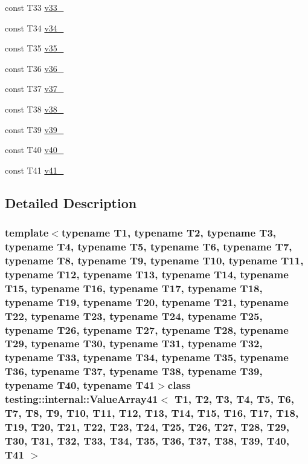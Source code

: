 \begin{DoxyCompactItemize}
\item 
const \-T33 \hyperlink{classtesting_1_1internal_1_1ValueArray41_a7a6cefe370b709c3a7b35b6d5ca8c778}{v33\-\_\-}
\item 
const \-T34 \hyperlink{classtesting_1_1internal_1_1ValueArray41_ab379e4d515d66bc57e05267515fab1d9}{v34\-\_\-}
\item 
const \-T35 \hyperlink{classtesting_1_1internal_1_1ValueArray41_a0a36112ac9b7a13572874977627ed192}{v35\-\_\-}
\item 
const \-T36 \hyperlink{classtesting_1_1internal_1_1ValueArray41_a531a52e3e8de6e982edd23c2547e4c49}{v36\-\_\-}
\item 
const \-T37 \hyperlink{classtesting_1_1internal_1_1ValueArray41_a2c4a91368c3edf933948acb4996a833d}{v37\-\_\-}
\item 
const \-T38 \hyperlink{classtesting_1_1internal_1_1ValueArray41_a364bf323d933a4adac3a9b46952ae1d3}{v38\-\_\-}
\item 
const \-T39 \hyperlink{classtesting_1_1internal_1_1ValueArray41_a0bd84ae118aa56fd251e494d1abc19fb}{v39\-\_\-}
\item 
const \-T40 \hyperlink{classtesting_1_1internal_1_1ValueArray41_ac99de9e6d59182db6141430e54f51e9c}{v40\-\_\-}
\item 
const \-T41 \hyperlink{classtesting_1_1internal_1_1ValueArray41_ad6f7550d60e8d13ade4c5033d07312e9}{v41\-\_\-}
\end{DoxyCompactItemize}


\subsection{\-Detailed \-Description}
\subsubsection*{template$<$typename T1, typename T2, typename T3, typename T4, typename T5, typename T6, typename T7, typename T8, typename T9, typename T10, typename T11, typename T12, typename T13, typename T14, typename T15, typename T16, typename T17, typename T18, typename T19, typename T20, typename T21, typename T22, typename T23, typename T24, typename T25, typename T26, typename T27, typename T28, typename T29, typename T30, typename T31, typename T32, typename T33, typename T34, typename T35, typename T36, typename T37, typename T38, typename T39, typename T40, typename T41$>$class testing\-::internal\-::\-Value\-Array41$<$ T1, T2, T3, T4, T5, T6, T7, T8, T9, T10, T11, T12, T13, T14, T15, T16, T17, T18, T19, T20, T21, T22, T23, T24, T25, T26, T27, T28, T29, T30, T31, T32, T33, T34, T35, T36, T37, T38, T39, T40, T41 $>$}



